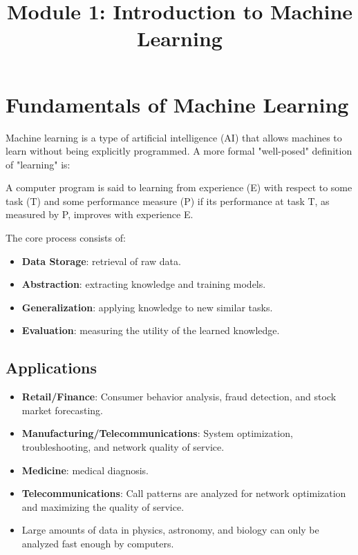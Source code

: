 \documentclass[12pt]{article}
\title{Module 1: Introduction to Machine Learning}
\begin{document}
\maketitle
\linespread{1.5}

\section{Fundamentals of Machine Learning}
Machine learning is a type of artificial intelligence (AI) that allows machines to learn without being explicitly programmed. A more formal "well-posed" definition of "learning" is:

\begin{framed}
  A computer program is said to learning from experience (E) with respect to some task (T) and some performance measure (P) if its performance at task T, as measured by P, improves with experience E.
\end{framed}

The core process consists of:
\begin{itemize}
  \item \textbf{Data Storage}: retrieval of raw data.
  \item \textbf{Abstraction}: extracting knowledge and training models.
  \item \textbf{Generalization}: applying knowledge to new similar tasks.
  \item \textbf{Evaluation}: measuring the utility of the learned knowledge.
\end{itemize}

\subsection{Applications}
\begin{itemize}
  \item \textbf{Retail/Finance}: Consumer behavior analysis, fraud detection, and stock market forecasting.
  \item \textbf{Manufacturing/Telecommunications}: System optimization, troubleshooting, and network quality of service.
  \item \textbf{Medicine}: medical diagnosis.
  \item \textbf{Telecommunications}: Call patterns are analyzed for network optimization and maximizing the quality of service.
  \item Large amounts of data in physics, astronomy, and biology can only be analyzed fast enough by computers.
\end{itemize}
\end{document}
